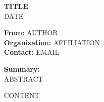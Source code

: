 \documentclass[11pt,a4paper]{article}
\begin{document}
\begin{center}
{\LARGE \textbf{{{TITLE}}}}\\
\vspace{0.4em}
{{{DATE}}}
\end{center}

\vspace{1em}
\noindent\textbf{From:} {{AUTHOR}}\\
\textbf{Organization:} {{AFFILIATION}}\\
\textbf{Contact:} {{EMAIL}}

\vspace{1em}
\noindent\textbf{Summary:}\\
{{ABSTRACT}}

\vspace{1em}
{{CONTENT}}
\end{document}
